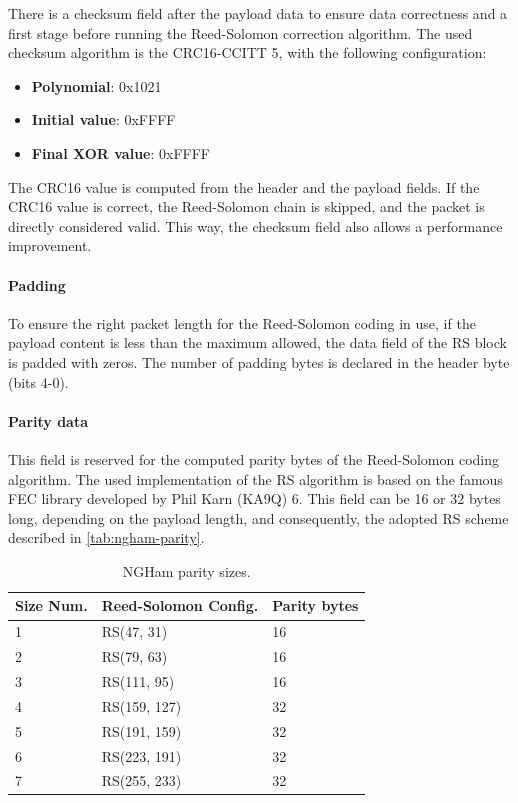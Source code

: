 There is a checksum field after the payload data to ensure data correctness and a first stage before running the Reed-Solomon correction algorithm. The used checksum algorithm is the CRC16-CCITT 5, with the following configuration:

\begin{itemize}
    \item \textbf{Polynomial}: 0x1021
    \item \textbf{Initial value}: 0xFFFF
    \item \textbf{Final XOR value}: 0xFFFF
\end{itemize}

The CRC16 value is computed from the header and the payload fields. If the CRC16 value is correct, the Reed-Solomon chain is skipped, and the packet is directly considered valid. This way, the checksum field also allows a performance improvement.

\paragraph{Padding}

To ensure the right packet length for the Reed-Solomon coding in use, if the payload content is less than the maximum allowed, the data field of the RS block is padded with zeros. The number of padding bytes is declared in the header byte (bits 4-0).

\paragraph{Parity data}

This field is reserved for the computed parity bytes of the Reed-Solomon coding algorithm. The used implementation of the RS algorithm is based on the famous FEC library developed by Phil Karn (KA9Q) 6. This field can be 16 or 32 bytes long, depending on the payload length, and consequently, the adopted RS scheme described in \autoref{tab:ngham-parity}.

\begin{table}[!ht]
    \centering
    \begin{tabular}{lll}
        \toprule[1.5pt]
        \textbf{Size Num.} & \textbf{Reed-Solomon Config.} & \textbf{Parity bytes} \\
        \midrule
        1 & RS(47, 31)   & 16 \\
        2 & RS(79, 63)   & 16 \\
        3 & RS(111, 95)  & 16 \\
        4 & RS(159, 127) & 32 \\
        5 & RS(191, 159) & 32 \\
        6 & RS(223, 191) & 32 \\
        7 & RS(255, 233) & 32 \\
        \bottomrule[1.5pt]
    \end{tabular}
    \caption{NGHam parity sizes.}
    \label{tab:ngham-parity}
\end{table}

